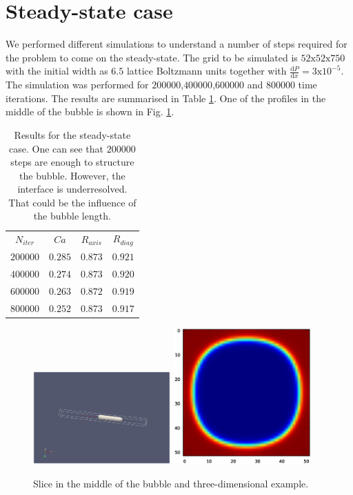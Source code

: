 \documentclass{article}
\begin{document}
\section{Steady-state case}
We performed different simulations to understand a number of steps required for the problem to come
on the steady-state. The grid to be simulated is $52\mathrm{x}52\mathrm{x}750$ with the initial
width as $6.5$ lattice Boltzmann units together with $\frac{\mathrm{d}P}{\mathrm{d}x}=3
\mathrm{x}10^{-5}$. The simulation was performed for $200000$,$400000$,$600000$ and $800000$ time
iterations. The results are summarised in Table \ref{table:steady:state}. One of the profiles in
the middle of the bubble is shown in Fig. \ref{fig:steady:state:profile:example}.
\begin{table}
\begin{tabular}{|c|c|c|c|}
$N_{iter}$&$Ca$&$R_{axis}$&$R_{diag}$\\
$200000$&$0.285$&$0.873$&$0.921$\\
$400000$&$0.274$&$0.873$&$0.920$\\
$600000$&$0.263$&$0.872$&$0.919$\\
$800000$&$0.252$&$0.873$&$0.917$\\
\end{tabular}
\caption{Results for the steady-state case. One can see that $200000$ steps are enough to structure
the bubble. However, the interface is underresolved. That could be the influence of the bubble
length.\label{table:steady:state}}
\end{table}
\begin{figure}
\includegraphics[width=0.47\textwidth]{Figures/bullet.eps}\hfill
\includegraphics[width=0.47\textwidth]{Figures/example_crossection.eps}\\
\caption{Slice in the middle of the bubble and
three-dimensional example. \label{fig:steady:state:profile:example}}
\end{figure}
\end{document}

